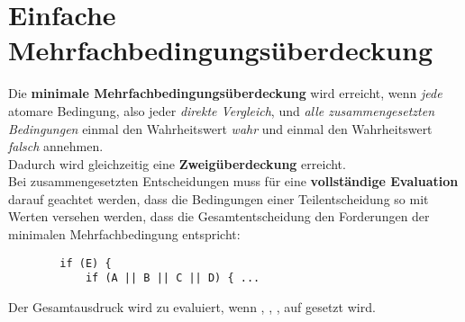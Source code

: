 \section{Einfache Mehrfachbedingungsüberdeckung}

\begin{tcolorbox}[title=Einfache Mehrfachbedingungsüberdeckung (minimale Mehrfachbedingungsüberdeckung)]
    Die \textbf{minimale Mehrfachbedingungsüberdeckung} wird erreicht, wenn \textit{jede} atomare Bedingung, also jeder \textit{direkte Vergleich}, und \textit{alle zusammengesetzten Bedingungen} einmal den Wahrheitswert \textit{wahr} und einmal den Wahrheitswert \textit{falsch} annehmen.\\
    Dadurch wird gleichzeitig eine \textbf{Zweigüberdeckung} erreicht.\\

    \noindent
    Bei zusammengesetzten Entscheidungen muss für eine \textbf{vollständige Evaluation} darauf geachtet werden, dass die Bedingungen einer Teilentscheidung so mit Werten versehen werden, dass die Gesamtentscheidung den Forderungen der minimalen Mehrfachbedingung entspricht:

    \begin{verbatim}
        if (E) {
            if (A || B || C || D) { ...

    \end{verbatim}

    \noindent
    Der Gesamtausdruck   wird zu  evaluiert, wenn , , ,  auf  gesetzt wird.\\


\end{tcolorbox}